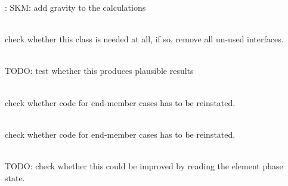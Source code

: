 \begin{DoxyRefList}
\+: SKM\+: add gravity to the calculations 
\item[Class \doxylink{classcsmp_1_1_grid_node}{csmp\+::Grid\+Node} ]\hfill \\
\label{todo__todo000119}%
%
check whether this class is needed at all, if so, remove all un-\/used interfaces.  
\item[Member \doxylink{classcsmp_1_1_h2_o___c_o2___na_cl___flow_functions_a4517188bf94b04433d0528d5a9f9920d}{csmp\+::H2\+O\+\_\+\+CO2\+\_\+\+Na\+Cl\+\_\+\+Flow\+Functions\texorpdfstring{$<$}{<} dim, USER \texorpdfstring{$>$}{>}\+::dfds} (\doxylink{classcsmp_1_1_element}{Element$<$ dim $>$} \texorpdfstring{$\ast$}{*}const, uint32\+\_\+t phase) const]\hfill \\
\label{todo__todo000226}%
%
TODO\+: test whether this produces plausible results  
\item[Member \doxylink{classcsmp_1_1_h2_o___c_o2___na_cl___flow_functions_ad2a592d411c632badeb976115eabdbc7}{csmp\+::H2\+O\+\_\+\+CO2\+\_\+\+Na\+Cl\+\_\+\+Flow\+Functions\texorpdfstring{$<$}{<} dim, USER \texorpdfstring{$>$}{>}\+::dfds\+\_\+at} (\doxylink{classcsmp_1_1_element}{Element$<$ dim $>$} \texorpdfstring{$\ast$}{*}const, uint32\+\_\+t phase, double sw) const]\hfill \\
\label{todo__todo000227}%
%
check whether code for end-\/member cases has to be reinstated.  
\item[Member \doxylink{classcsmp_1_1_h2_o___c_o2___na_cl___flow_functions_a68f3bdfd72c83966cf18845ab0517100}{csmp\+::H2\+O\+\_\+\+CO2\+\_\+\+Na\+Cl\+\_\+\+Flow\+Functions\texorpdfstring{$<$}{<} dim, USER \texorpdfstring{$>$}{>}\+::dfds\+\_\+at\+\_\+\+Numerical} (\doxylink{classcsmp_1_1_element}{Element$<$ dim $>$} \texorpdfstring{$\ast$}{*}const, double sw, double delta\+\_\+s=0.\+001) const]\hfill \\
\label{todo__todo000228}%
%
check whether code for end-\/member cases has to be reinstated.  
\item[Member \doxylink{classcsmp_1_1_h2_o___c_o2___na_cl___flow_functions_aa00cd636db46b34fcdfc6257aad99dd2}{csmp\+::H2\+O\+\_\+\+CO2\+\_\+\+Na\+Cl\+\_\+\+Flow\+Functions\texorpdfstring{$<$}{<} dim, USER \texorpdfstring{$>$}{>}\+::Interpolate\+Aqueous\+Phase} (\doxylink{classcsmp_1_1_element}{Element$<$ dim $>$} \texorpdfstring{$\ast$}{*}const, double \&sw, double \&rhow, double \&muw) const]\hfill \\
\label{todo__todo000225}%
%
TODO\+: check whether this could be improved by reading the element phase state. 
\item[Class \doxylink{classcsmp_1_1_h2_o_fluid_properties}{csmp\+::H2\+OFluid\+Properties} ]\hfill \\
\label{todo__todo000067}%
%


\end{DoxyRefList}
